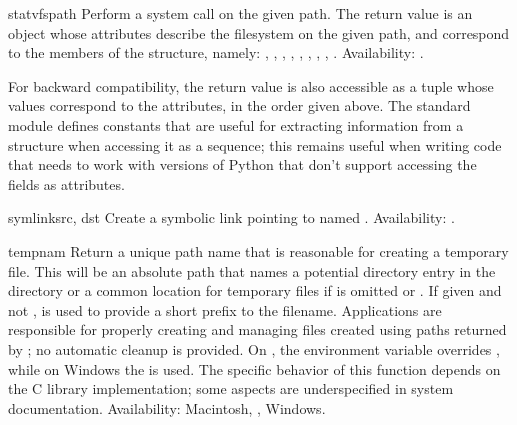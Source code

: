 \begin{funcdesc}{statvfs}{path}
Perform a  system call on the given path.  The
return value is an object whose attributes describe the filesystem on
the given path, and correspond to the members of the
 structure, namely:
,
,
,
,
,
,
,
,
.
Availability: \UNIX.

For backward compatibility, the return value is also accessible as a
tuple whose values correspond to the attributes, in the order given above.
The standard module 
defines constants that are useful for extracting information
from a  structure when accessing it as a sequence; this
remains useful when writing code that needs to work with versions of
Python that don't support accessing the fields as attributes.

\end{funcdesc}

\begin{funcdesc}{symlink}{src, dst}
Create a symbolic link pointing to  named .
Availability: \UNIX.
\end{funcdesc}

\begin{funcdesc}{tempnam}{}
Return a unique path name that is reasonable for creating a temporary
file.  This will be an absolute path that names a potential directory
entry in the directory  or a common location for temporary
files if  is omitted or .  If given and not
,  is used to provide a short prefix to the
filename.  Applications are responsible for properly creating and
managing files created using paths returned by ;
no automatic cleanup is provided.
On \UNIX, the environment variable  overrides
, while on Windows the  is used.  The specific
behavior of this function depends on the C library implementation;
some aspects are underspecified in system documentation.
  Availability: Macintosh, \UNIX, Windows.
\end{funcdesc}

